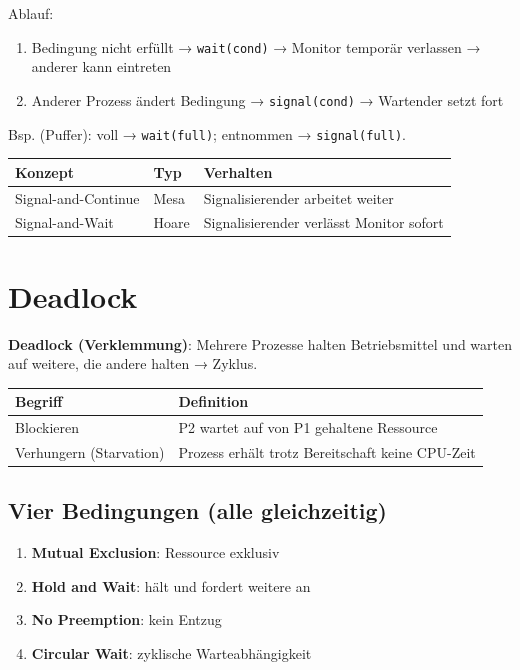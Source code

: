 \documentclass[11pt, a4paper]{article}
\begin{document}
Ablauf:

\begin{enumerate}
  \item Bedingung nicht erfüllt → \texttt{wait(cond)} → Monitor temporär verlassen → anderer kann eintreten
  \item Anderer Prozess ändert Bedingung → \texttt{signal(cond)} → Wartender setzt fort
\end{enumerate}

Bsp. (Puffer): voll → \texttt{wait(full)}; entnommen → \texttt{signal(full)}.



{\small
\begin{tabularx}{\linewidth}{XXX}
\hline
\rowcolor{tableheadbg}
{\color{white}\textbf{Konzept}} & {\color{white}\textbf{Typ}} & {\color{white}\textbf{Verhalten}} \\[2pt]
\hline
\endhead
\hline
\endfoot
Signal-and-Continue & Mesa & Signalisierender arbeitet weiter \\
Signal-and-Wait & Hoare & Signalisierender verlässt Monitor sofort \\
\end{tabularx}
}



\section{Deadlock}

\textbf{Deadlock (Verklemmung)}: Mehrere Prozesse halten Betriebsmittel und warten auf weitere, die andere halten → Zyklus.



{\small
\begin{tabularx}{\linewidth}{XX}
\hline
\rowcolor{tableheadbg}
{\color{white}\textbf{Begriff}} & {\color{white}\textbf{Definition}} \\[2pt]
\hline
\endhead
\hline
\endfoot
Blockieren & P2 wartet auf von P1 gehaltene Ressource \\
Verhungern (Starvation) & Prozess erhält trotz Bereitschaft keine CPU-Zeit \\
\end{tabularx}
}



\subsection{Vier Bedingungen (alle gleichzeitig)}
\begin{enumerate}
  \item \textbf{Mutual Exclusion}: Ressource exklusiv
  \item \textbf{Hold and Wait}: hält und fordert weitere an
  \item \textbf{No Preemption}: kein Entzug
  \item \textbf{Circular Wait}: zyklische Warteabhängigkeit
\end{enumerate}
\end{document}
